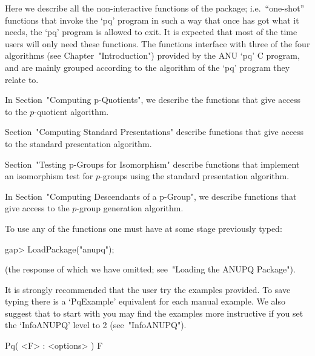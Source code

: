 

Here we describe  all  the  non-interactive  functions  of  the  {\ANUPQ}
package; i.e.~``one-shot'' functions that invoke the `pq' program in such
a way that once {\GAP} has got what it needs, the `pq' program is allowed
to exit. It is expected that most of the time users will only need  these
functions. The functions interface with three of the four algorithms (see
Chapter~"Introduction") provided by the  ANU  `pq'  C  program,  and  are
mainly grouped according to the algorithm of the `pq' program they relate
to.

In Section~"Computing p-Quotients", we describe the functions  that  give
access to the $p$-quotient algorithm.

Section~"Computing Standard Presentations" describe functions  that  give
access to the standard presentation algorithm.

Section~"Testing  p-Groups  for  Isomorphism"  describe  functions   that
implement  an  isomorphism  test  for  $p$-groups  using   the   standard
presentation algorithm.

In Section~"Computing Descendants of a p-Group",  we  describe  functions
that give access to the $p$-group generation algorithm.

To use any of the functions one must have at some stage previously typed:

\begintt
gap> LoadPackage("anupq");
\endtt

(the response of which we have omitted; see~"Loading the ANUPQ Package").

It is strongly recommended that the user try the  examples  provided.  To
save typing there is a `PqExample' equivalent for each manual example. We
also  suggest  that  to  start  with  you  may  find  the  examples  more
instructive if you set the `InfoANUPQ' level to 2 (see~"InfoANUPQ").


\>Pq( <F> : <options> ) F

